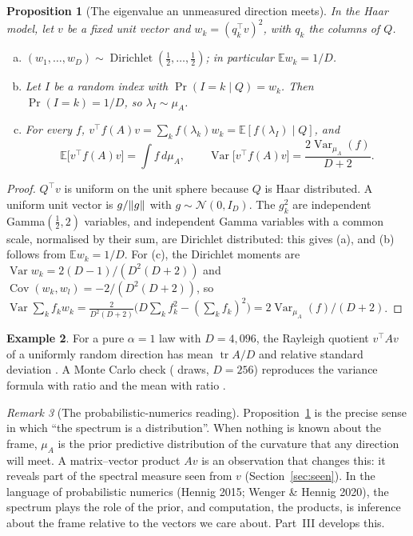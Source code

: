 \documentclass[11pt,a4paper]{article}
\newcommand{\E}{\mathbb{E}}
\DeclareMathOperator{\tr}{tr}
\DeclareMathOperator{\Var}{Var}
\DeclareMathOperator{\Cov}{Cov}
\DeclareMathOperator{\Dir}{Dirichlet}
\DeclarePairedDelimiter{\norm}{\lVert}{\rVert}
\theoremstyle{plain}
\newtheorem{proposition}{Proposition}[section]
\theoremstyle{definition}
\newtheorem{example}[proposition]{Example}
\theoremstyle{remark}
\newtheorem{remark}[proposition]{Remark}
\begin{document}
\begin{proposition}[The eigenvalue an unmeasured direction meets]\label{prop:haar}
In the Haar model, let $v$ be a fixed unit vector and $w_k=(q_k^\top v)^2$, with $q_k$ the columns of $Q$.
\begin{enumerate}[(a)]
\item $(w_1,\dots,w_D)\sim\Dir(\tfrac12,\dots,\tfrac12)$; in particular $\E w_k=1/D$.
\item Let $I$ be a random index with $\Pr(I=k\mid Q)=w_k$. Then $\Pr(I=k)=1/D$, so $\lambda_I\sim\mu_A$.
\item For every $f$, $v^\top f(A)v=\sum_kf(\lambda_k)w_k=\E[f(\lambda_I)\mid Q]$, and
\[
\E\bigl[v^\top f(A)v\bigr]=\int f\,d\mu_A,\qquad \Var\bigl[v^\top f(A)v\bigr]=\frac{2\Var_{\mu_A}(f)}{D+2}.
\]
\end{enumerate}
\end{proposition}
\begin{proof}
$Q^\top v$ is uniform on the unit sphere because $Q$ is Haar distributed. A uniform unit vector is $g/\norm{g}$ with
$g\sim\mathcal{N}(0,I_D)$. The $g_k^2$ are independent Gamma$(\frac12,2)$ variables, and independent Gamma variables
with a common scale, normalised by their sum, are Dirichlet distributed: this gives (a), and (b) follows from
$\E w_k=1/D$. For (c), the Dirichlet moments are $\Var w_k=2(D-1)/(D^2(D+2))$ and $\Cov(w_k,w_l)=-2/(D^2(D+2))$, so
$\Var\sum_kf_kw_k=\frac{2}{D^2(D+2)}\bigl(D\sum_kf_k^2-(\sum_kf_k)^2\bigr)=2\Var_{\mu_A}(f)/(D+2)$.
\end{proof}

\begin{example}\label{ex:haar}
For a pure $\alpha=1$ law with $D=4{,}096$, the Rayleigh quotient $v^\top Av$ of a uniformly random direction has mean
$\tr A/D$ and relative standard deviation \NumHaarRelSd. A Monte Carlo check (\NumHaarMCDraws{} draws, $D=256$)
reproduces the variance formula with ratio \NumHaarMCVarRatio{} and the mean with ratio \NumHaarMCMeanRatio.
\end{example}

\begin{remark}[The probabilistic-numerics reading]\label{rem:pn}
Proposition~\ref{prop:haar} is the precise sense in which ``the spectrum is a distribution''. When nothing is known
about the frame, $\mu_A$ is the prior predictive distribution of the curvature that any direction will meet. A
matrix--vector product $Av$ is an observation that changes this: it reveals part of the spectral measure seen from
$v$ (Section~\ref{sec:seen}). In the language of probabilistic numerics (Hennig 2015; Wenger \& Hennig 2020), the
spectrum plays the role of the prior, and computation, the products, is inference about the frame relative to the
vectors we care about. Part~III develops this.
\end{remark}
\end{document}
